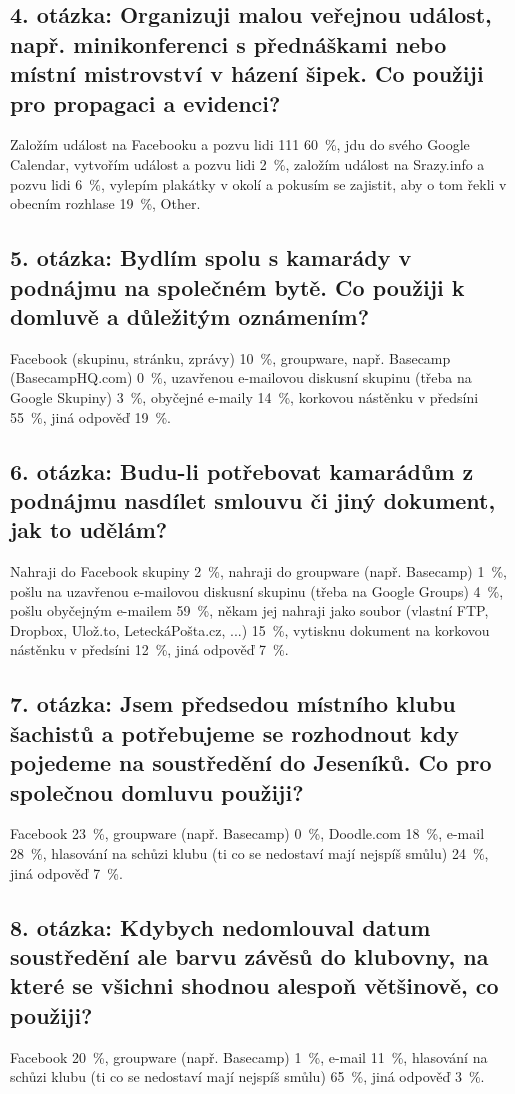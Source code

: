 \documentclass[12pt,oneside,final]{fithesis2}
\begin{document}
\subsection*{4. otázka: Organizuji malou veřejnou událost, např. minikonferenci s přednáškami nebo místní mistrovství v házení šipek. Co použiji pro propagaci a evidenci?}
Založím událost na Facebooku a pozvu lidi 111 60~\%,
jdu do svého Google Calendar, vytvořím událost a pozvu lidi 2~\%,
založím událost na Srazy.info a pozvu lidi 6~\%,
vylepím plakátky v okolí a pokusím se zajistit, aby o tom řekli v obecním rozhlase 19~\%,
Other.

\subsection*{5. otázka: Bydlím spolu s kamarády v podnájmu na společném bytě. Co použiji k domluvě a důležitým oznámením?}
Facebook (skupinu, stránku, zprávy) 10~\%,
groupware, např. Basecamp (BasecampHQ.com) 0~\%,
uzavřenou e-mailovou diskusní skupinu (třeba na Google Skupiny) 3~\%,
obyčejné e-maily 14~\%,
korkovou nástěnku v předsíni 55~\%,
jiná odpověď 19~\%.

\subsection*{6. otázka: Budu-li potřebovat kamarádům z podnájmu nasdílet smlouvu či jiný dokument, jak to udělám?}
Nahraji do Facebook skupiny 2~\%,
nahraji do groupware (např. Basecamp) 1~\%,
pošlu na uzavřenou e-mailovou diskusní skupinu (třeba na Google Groups) 4~\%,
pošlu obyčejným e-mailem 59~\%,
někam jej nahraji jako soubor (vlastní FTP, Dropbox, Ulož.to, LeteckáPošta.cz, ...) 15~\%,
vytisknu dokument na korkovou nástěnku v předsíni 12~\%,
jiná odpověď 7~\%.

\subsection*{7. otázka: Jsem předsedou místního klubu šachistů a potřebujeme se rozhodnout kdy pojedeme na soustředění do Jeseníků. Co pro společnou domluvu použiji?}
Facebook 23~\%,
groupware (např. Basecamp) 0~\%,
Doodle.com 18~\%,
e-mail 28~\%,
hlasování na schůzi klubu (ti co se nedostaví mají nejspíš smůlu) 24~\%,
jiná odpověď 7~\%.

\subsection*{8. otázka: Kdybych nedomlouval datum soustředění ale barvu závěsů do klubovny, na které se všichni shodnou alespoň většinově, co použiji?}
Facebook 20~\%,
groupware (např. Basecamp) 1~\%,
e-mail 11~\%,
hlasování na schůzi klubu (ti co se nedostaví mají nejspíš smůlu) 65~\%,
jiná odpověď 3~\%.
\end{document}
